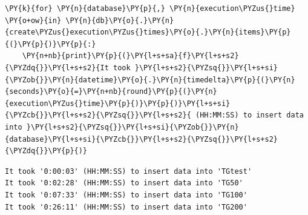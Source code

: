     \begin{tcolorbox}[breakable, size=fbox, boxrule=1pt, pad at break*=1mm,colback=cellbackground, colframe=cellborder]
\begin{Verbatim}[commandchars=\\\{\}]
\PY{k}{for} \PY{n}{database}\PY{p}{,} \PY{n}{execution\PYZus{}time} \PY{o+ow}{in} \PY{n}{db}\PY{o}{.}\PY{n}{create\PYZus{}execution\PYZus{}times}\PY{o}{.}\PY{n}{items}\PY{p}{(}\PY{p}{)}\PY{p}{:}
    \PY{n+nb}{print}\PY{p}{(}\PY{l+s+sa}{f}\PY{l+s+s2}{\PYZdq{}}\PY{l+s+s2}{It took }\PY{l+s+s2}{\PYZsq{}}\PY{l+s+si}{\PYZob{}}\PY{n}{datetime}\PY{o}{.}\PY{n}{timedelta}\PY{p}{(}\PY{n}{seconds}\PY{o}{=}\PY{n+nb}{round}\PY{p}{(}\PY{n}{execution\PYZus{}time}\PY{p}{)}\PY{p}{)}\PY{l+s+si}{\PYZcb{}}\PY{l+s+s2}{\PYZsq{}}\PY{l+s+s2}{ (HH:MM:SS) to insert data into }\PY{l+s+s2}{\PYZsq{}}\PY{l+s+si}{\PYZob{}}\PY{n}{database}\PY{l+s+si}{\PYZcb{}}\PY{l+s+s2}{\PYZsq{}}\PY{l+s+s2}{\PYZdq{}}\PY{p}{)}
\end{Verbatim}
\end{tcolorbox}

    \begin{Verbatim}[commandchars=\\\{\}]
It took '0:00:03' (HH:MM:SS) to insert data into 'TGtest'
It took '0:02:28' (HH:MM:SS) to insert data into 'TG50'
It took '0:07:33' (HH:MM:SS) to insert data into 'TG100'
It took '0:26:11' (HH:MM:SS) to insert data into 'TG200'
    \end{Verbatim}

